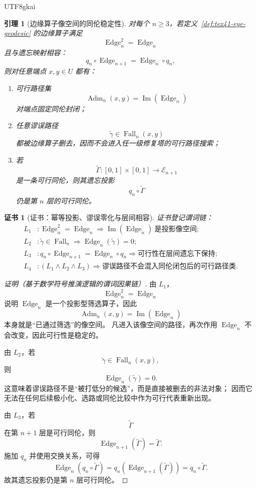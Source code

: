 \documentclass[12pt]{article}
\newtheorem{lemma}{引理}[section]
\newtheorem{Certificate}{证书}[section]
\newcommand{\Fall}{\operatorname{Fall}}
\newcommand{\Edge}{\operatorname{Edge}}
\newcommand{\Adm}{\operatorname{Adm}}
\newcommand{\Img}{\operatorname{Im}}
\begin{document}
\begin{CJK*}{UTF8}{gkai}
\begin{lemma}[边缘算子像空间的同伦稳定性]
\label{lem:tex41-edge}
对每个 $n\ge 3$，若定义~\ref{def:tex41-eye-geodesic} 的边缘算子满足
\[
  \Edge_n^2=\Edge_n
\]
且与遗忘映射相容：
\[
  q_n\circ \Edge_{n+1}=\Edge_n\circ q_n,
\]
则对任意端点 $x,y\in U$ 都有：
\begin{enumerate}
  \item 可行路径集
  \[
    \Adm_n(x,y)=\Img(\Edge_n)
  \]
  对端点固定同伦封闭；
  \item 任意谬误路径
  \[
    \widetilde\gamma\in\Fall_n(x,y)
  \]
  都被边缘算子删去，因而不会进入任一级修复塔的可行路径搜索；
  \item 若
  \[
    \widetilde\Gamma:[0,1]\times[0,1]\to\mathcal E_{n+1}
  \]
  是一条可行同伦，则其遗忘投影
  \[
    q_n\circ\widetilde\Gamma
  \]
  仍是第 $n$ 层的可行同伦。
\end{enumerate}
\end{lemma}

\begin{Certificate}[证书：幂等投影、谬误零化与层间相容]
\label{cert:tex41-edge}
证书登记谓词链：
\[
\begin{aligned}
  L_1 &: \Edge_n^2=\Edge_n
  \Rightarrow
  \Img(\Edge_n)\ \text{是投影像空间};\\
  L_2 &: \widetilde\gamma\in\Fall_n
  \Rightarrow
  \Edge_n(\widetilde\gamma)=0;\\
  L_3 &: q_n\circ\Edge_{n+1}=\Edge_n\circ q_n
  \Rightarrow
  \text{可行性在层间遗忘下保持};\\
  L_4 &: (L_1\wedge L_2\wedge L_3)
  \Rightarrow
  \text{谬误路径不会混入同伦闭包后的可行路径类}.
\end{aligned}
\]
\end{Certificate}

\begin{proof}[证明（基于数学符号推演逻辑的谓词因果链）]
由 $L_1$，
\[
  \Edge_n^2=\Edge_n
\]
说明 $\Edge_n$ 是一个投影型筛选算子，因此
\[
  \Adm_n(x,y)=\Img(\Edge_n)
\]
本身就是“已通过筛选”的像空间。
凡进入该像空间的路径，再次作用 $\Edge_n$ 不会改变，因此可行性是稳定的。

由 $L_2$，若
\[
  \widetilde\gamma\in\Fall_n(x,y),
\]
则
\[
  \Edge_n(\widetilde\gamma)=0.
\]
这意味着谬误路径不是“被打低分的候选”，而是直接被删去的非法对象；
因而它无法在任何后续极小化、选路或同伦比较中作为可行代表重新出现。

由 $L_3$，若
\[
  \widetilde\Gamma
\]
在第 $n+1$ 层是可行同伦，则
\[
  \Edge_{n+1}(\widetilde\Gamma)=\widetilde\Gamma.
\]
施加 $q_n$ 并使用交换关系，可得
\[
  \Edge_n(q_n\circ\widetilde\Gamma)
  =
  q_n(\Edge_{n+1}(\widetilde\Gamma))
  =
  q_n\circ\widetilde\Gamma.
\]
故其遗忘投影仍是第 $n$ 层可行同伦。


\end{proof}
\end{CJK*}
\end{document}
